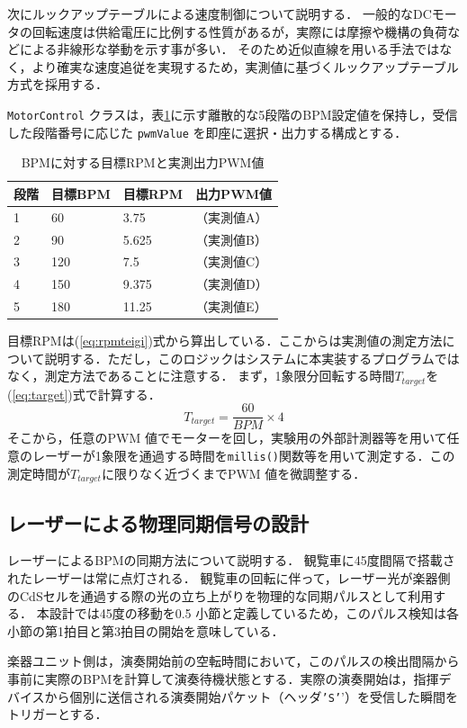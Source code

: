 \documentclass[lualatex,book,paper=a4paper,jafontsize=11.5pt,jafontscale=1.05]{jlreq}
\begin{document}
次にルックアップテーブルによる速度制御について説明する．
一般的なDCモータの回転速度は供給電圧に比例する性質があるが\cite{ref:control}，実際には摩擦や機構の負荷などによる非線形な挙動を示す事が多い．
そのため近似直線を用いる手法ではなく，より確実な速度追従を実現するため，実測値に基づくルックアップテーブル方式を採用する．

\texttt{MotorControl} クラスは，表\ref{tab:pwm_lut}に示す離散的な5段階のBPM設定値を保持し，受信した段階番号に応じた \texttt{pwmValue} を即座に選択・出力する構成とする．
\begin{table}[H]
\centering
\caption{BPMに対する目標RPMと実測出力PWM値}
\label{tab:pwm_lut}
\begin{tabular}{llll}
\hline
\textbf{段階} & \textbf{目標BPM} & \textbf{目標RPM} & \textbf{出力PWM値} \\ \hline
1 & 60 & 3.75 &（実測値A）\\
2 & 90 & 5.625 &（実測値B）\\
3 & 120 & 7.5 &（実測値C）\\
4 & 150 & 9.375 &（実測値D）\\
5 & 180 & 11.25 &（実測値E）\\ \hline
\end{tabular}
\end{table}
目標RPMは(\ref{eq:rpmteigi})式から算出している．ここからは実測値の測定方法について説明する．ただし，このロジックはシステムに本実装するプログラムではなく，測定方法であることに注意する．
まず，1象限分回転する時間$T_{target}$を(\ref{eq:target})式で計算する．
\begin{equation}
\label{eq:target}
    T_{target} = \frac{60}{BPM} \times 4
\end{equation}
そこから，任意のPWM 値でモーターを回し，実験用の外部計測器等を用いて任意のレーザーが1象限を通過する時間を\texttt{millis()}関数等を用いて測定する．この測定時間が$T_{target}$に限りなく近づくまでPWM 値を微調整する．

\subsection{レーザーによる物理同期信号の設計}
レーザーによるBPMの同期方法について説明する．
観覧車に45度間隔で搭載されたレーザーは常に点灯される．
観覧車の回転に伴って，レーザー光が楽器側のCdSセルを通過する際の光の立ち上がりを物理的な同期パルスとして利用する．
本設計では45度の移動を0.5 小節と定義しているため，このパルス検知は各小節の第1拍目と第3拍目の開始を意味している．

楽器ユニット側は，演奏開始前の空転時間において，このパルスの検出間隔から事前に実際のBPMを計算して演奏待機状態とする．実際の演奏開始は，指揮デバイスから個別に送信される演奏開始パケット（ヘッダ\texttt{'S'}'）を受信した瞬間をトリガーとする．
\end{document}
